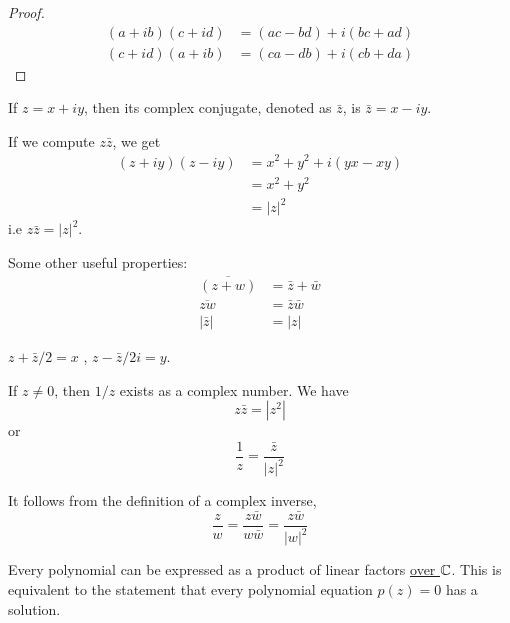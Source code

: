 \documentclass{article}
\begin{document}
	\begin{eg} $ $
		\begin{proof}
			\begin{align*}
				(a+ib)(c+id) &= (ac-bd) + i(bc + ad) \\
				(c+id)(a+ib) &= (ca-db) + i(cb + da)
			\end{align*}
		\end{proof}
	\end{eg}

	\begin{defi}
		If $z=x+iy$, then its complex conjugate, denoted as $\bar{z}$, is $\bar{z} = x-iy$.
	\end{defi}

	\begin{eg}
		If we compute $z\bar{z}$, we get
		\begin{align*}
			(z+iy)(z-iy) &= x^2 + y^2 + i(yx-xy) \\
			&= x^2 + y^2 \\
			&= |z|^2
		\end{align*}
		i.e $z\bar{z} = |z|^2$.
	\end{eg}
	Some other useful properties:
	\begin{align*}
		\overline{(z+w)} &= \bar{z} + \bar{w} \\
		\overline{zw} &= \bar{z} \bar{w} \\
		|\bar{z}| &= |z|
	\end{align*}

	\begin{note}
		$z+\bar{z}/2 = x$ , $z-\bar{z}/2i = y$.
	\end{note}

	\begin{defi}[Inverses]
		If $z\neq 0$, then $1/z$ exists as a complex number. We have
		\[
			z\bar{z} = |z^2|
		\]
		or
		\[
			\frac{1}{z} = \frac{\bar{z}}{|z|^2}
		\]
	\end{defi}

	\begin{defi}[Division]
		It follows from the definition of a complex inverse,
		\[
			\frac{z}{w} = \frac{z\bar{w}}{w\bar{w}} = \frac{z\bar{w}}{|w|^2}
		\]
	\end{defi}

	\begin{thm}
		Every polynomial can be expressed as a product of linear factors \underline{over $\mathbb{C}$}. This is equivalent to the statement that every polynomial equation $p(z)=0$ has a solution.
	\end{thm}
\end{document}
